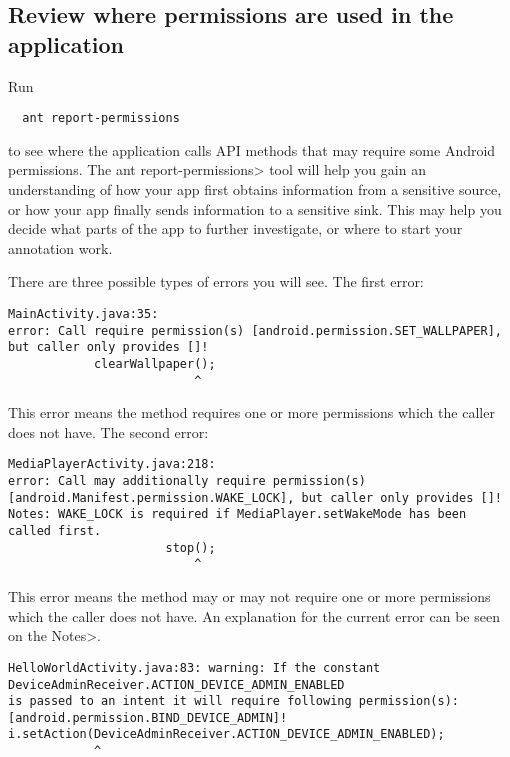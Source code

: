 \subsection{Review where permissions are used in the application}
\label{sec:appanalysis/report-permissions}


Run

\begin{Verbatim}
  ant report-permissions
\end{Verbatim}

\noindent
to see where the application calls API methods that may require some Android permissions.  
The \<ant report-permissions> tool will help you gain an understanding of how your
app first obtains information from a sensitive source, or how your app
finally sends information to a sensitive sink.  This may help you decide
what parts of the app to further investigate, or where to start your
annotation work.

There are three possible types of errors you will see. The first error:

\begin{Verbatim}
MainActivity.java:35: 
error: Call require permission(s) [android.permission.SET_WALLPAPER], 
but caller only provides []!
			clearWallpaper();
			              ^
\end{Verbatim}
This error means the method requires one or more permissions which the caller does not have.
The second error:

\begin{Verbatim}
MediaPlayerActivity.java:218:
error: Call may additionally require permission(s) 
[android.Manifest.permission.WAKE_LOCK], but caller only provides []! 
Notes: WAKE_LOCK is required if MediaPlayer.setWakeMode has been called first.
			          stop();
			              ^
\end{Verbatim}

This error means the method may or may not require one or more permissions which the caller
does not have. An explanation for the current error can be seen on the \<Notes>. 

\begin{Verbatim}
HelloWorldActivity.java:83: warning: If the constant DeviceAdminReceiver.ACTION_DEVICE_ADMIN_ENABLED 
is passed to an intent it will require following permission(s): [android.permission.BIND_DEVICE_ADMIN]! 
i.setAction(DeviceAdminReceiver.ACTION_DEVICE_ADMIN_ENABLED);
            ^
\end{Verbatim}

